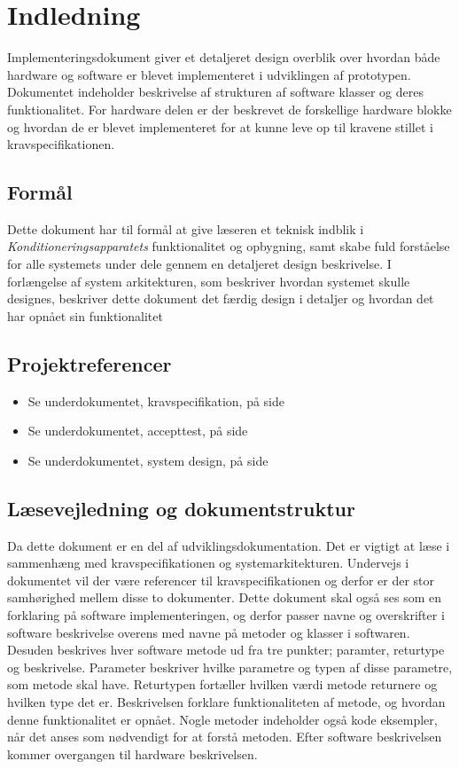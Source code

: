 	\chapter{Indledning}
	Implementeringsdokument giver et detaljeret design overblik over hvordan både hardware og software er blevet implementeret i udviklingen af prototypen. Dokumentet indeholder beskrivelse af strukturen af software klasser og deres funktionalitet. For hardware delen er der beskrevet de forskellige hardware blokke og hvordan de er blevet implementeret for at kunne leve op til kravene stillet i kravspecifikationen. 
	
	\section{Formål}
	Dette dokument har til formål at give læseren et teknisk indblik i \textit{Konditioneringsapparatets} funktionalitet og opbygning, samt skabe fuld forståelse for alle systemets under dele gennem en detaljeret design beskrivelse. I forlængelse af system arkitekturen, som beskriver hvordan systemet skulle designes, beskriver dette dokument det færdig design i detaljer og hvordan det har opnået sin funktionalitet
	
	\section{Projektreferencer}
	\begin{itemize}
		\item Se underdokumentet, kravspecifikation, på side \pageref{part:ks}
		\item Se underdokumentet, accepttest, på side \pageref{part:at}
		\item Se underdokumentet, system design, på side \pageref{part:sd}
	\end{itemize}
	
	\section{Læsevejledning og dokumentstruktur}
	Da dette dokument er en del af udviklingsdokumentation. Det er vigtigt at læse i sammenhæng med kravspecifikationen og systemarkitekturen. Undervejs i dokumentet vil der være referencer til kravspecifikationen og derfor er der stor samhørighed mellem disse to dokumenter. Dette dokument skal også ses som en forklaring på software implementeringen, og derfor passer navne og overskrifter i software beskrivelse overens med navne på metoder og klasser i softwaren. Desuden beskrives hver software metode ud fra tre punkter; paramter, returtype og beskrivelse. Parameter beskriver hvilke parametre og typen af disse parametre, som metode skal have. Returtypen fortæller hvilken værdi metode returnere og hvilken type det er. Beskrivelsen forklare funktionaliteten af metode, og hvordan denne funktionalitet er opnået. Nogle metoder indeholder også kode eksempler, når det anses som nødvendigt for at forstå metoden. Efter software beskrivelsen kommer overgangen til hardware beskrivelsen.
	
